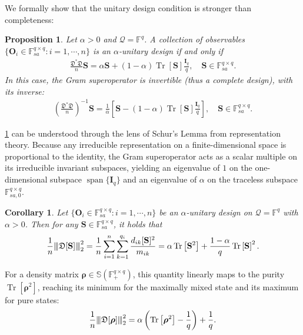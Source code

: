 \documentclass[noinfoline]{imsart}\setcounter{tocdepth}{2}
\renewcommand{\b}[1]{\mathbb{#1}} %
\newcommand{\m}[1]{\mathbf{#1}} %
\newcommand{\f}[1]{\mathfrak{#1}} %
\renewcommand{\c}[1]{\mathcal{#1}} %
\newcommand{\mb}[1]{\boldsymbol{#1}} %
\newcommand{\tr}[1]{\operatorname{Tr}\left[#1\right]}
\newcommand{\vertiii}[1]{{\left\vert\kern-0.25ex\left\vert\kern-0.25ex\left\vert #1 
    \right\vert\kern-0.25ex\right\vert\kern-0.25ex\right\vert}} %
\DeclareMathOperator*{\spann}{span}
\theoremstyle{plain}
\newtheorem{corollary}[theorem]{Corollary}
\newtheorem{proposition}[theorem]{Proposition}
\begin{document}
We formally show that the unitary design condition is stronger than completeness:
\begin{proposition}\label{prop:unit:design}
Let $\alpha > 0$ and $\c{Q} = \b{F}^{q}$. A collection of observables $\{\m{O}_{i} \in \b{F}_{sa}^{q \times q}: i = 1, \cdots, n\}$ is an $\alpha$-unitary design if and only if
\begin{align*}
    \frac{\f{D}^{*} \f{D}}{n} \m{S} = \alpha \m{S} + (1-\alpha) \tr{\m{S}} \frac{\m{I}_{q}}{q} , \quad \m{S} \in \b{F}_{sa}^{q \times q}.
\end{align*}
In this case, the Gram superoperator is invertible (thus a complete design), with its inverse:
\begin{align*}
    \left( \frac{\f{D}^{*} \f{D}}{n} \right)^{-1} \m{S} = \frac{1}{\alpha} \left[ \m{S} - (1-\alpha) \tr{\m{S}} \frac{\m{I}_{q}}{q} \right], \quad \m{S} \in \b{F}_{sa}^{q \times q}.
\end{align*}
\end{proposition}

\cref{prop:unit:design} can be understood through the lens of Schur's Lemma \cite{faraut2008analysis} from representation theory. Because any irreducible representation on a finite-dimensional space is proportional to the identity, the Gram superoperator acts as a scalar multiple on its irreducible invariant subspaces, yielding an eigenvalue of $1$ on the one-dimensional subspace $\spann\{\m{I}_{q}\}$ and an eigenvalue of $\alpha$ on the traceless subspace $\b{F}_{sa, 0}^{q \times q}$.

\begin{corollary}\label{prop:sq:sum:proj}
Let $\{\m{O}_{i} \in \b{F}_{sa}^{q \times q}: i = 1, \cdots, n\}$ be an $\alpha$-unitary design on $\c{Q} = \b{F}^{q}$ with $\alpha > 0$. Then for any $\m{S} \in \b{F}_{sa}^{q \times q}$, it holds that
\begin{equation*}
    \frac{1}{n} \vertiii{\f{D} [\m{S}]}_{2}^{2} = \frac{1}{n} \sum_{i=1}^{n} \sum_{k=1}^{q_{i}} \frac{d_{ik}[\m{S}]^{2}}{m_{ik}} = \alpha \tr{\m{S}^{2}} + \frac{1-\alpha}{q} \tr{\m{S}}^{2}.
\end{equation*}
\end{corollary}

For a density matrix $\mb{\rho} \in \b{S}(\b{F}_{+}^{q \times q})$, this quantity linearly maps to the purity $\tr{\mb{\rho}^2}$, reaching its minimum for the maximally mixed state and its maximum for pure states:
\begin{equation*}
    \frac{1}{n} \vertiii{\f{D} [\mb{\rho}]}_{2}^{2} = \alpha \left(\tr{\mb{\rho}^{2}} - \frac{1}{q} \right) + \frac{1}{q}.
\end{equation*}
\end{document}
